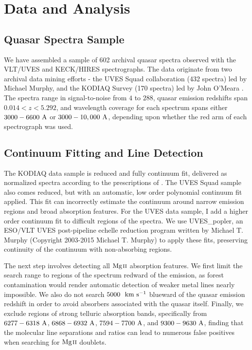 \documentclass[iop,apj,numberedappendix,appendixfloats,twocolappendix]{emulateapj}
\begin{document}

\section{Data and Analysis}
\label{sec:data}

\subsection{Quasar Spectra Sample}

We have assembled a sample of 602 archival quasar spectra observed with the VLT/UVES and KECK/HIRES spectrographs. The data originate from two archival data mining efforts - the UVES Squad collaboration (432 spectra) led by Michael Murphy, and the KODIAQ Survey (170 spectra) led by John O'Meara \citep{OMeara2015}. The spectra range in signal-to-noise from $4$ to $288$, quasar emission redshifts span $0.014 < z < 5.292$, and wavelength coverage for each spectrum spans either $3000 - 6600~\mathrm{\AA}$ or $3000 - 10,000~\mathrm{\AA}$, depending upon whether the red arm of each spectrograph was used.


\subsection{Continuum Fitting and Line Detection}
\label{sec:detection}

The KODIAQ data sample is reduced and fully continuum fit, delivered as normalized spectra according to the prescriptions of \cite{OMeara2015}. The UVES Squad sample also comes reduced, but with an automatic, low order polynomial continuum fit applied. This fit can incorrectly estimate the continuum around narrow emission regions and broad absorption features. For the UVES data sample, I add a higher order continuum fit to difficult regions of the spectra. We use UVES\_popler, an ESO/VLT UVES post-pipeline echelle reduction program written by Michael T. Murphy (Copyright 2003-2015 Michael T. Murphy) to apply these fits, preserving continuity of the continuum with non-absorbing regions. 

The next step involves detecting all ${\hbox{{\rm Mg}\kern 0.1em{\sc ii}}}$ absorption features. We first limit the search range to regions of the spectrum redward of the {\Lya} emission, as {\Lya} forest contamination would render automatic detection of weaker metal lines nearly impossible. We also do not search $5000~\mathrm{~\hbox{km~s$^{-1}$}}$ blueward of the quasar emission redshift in order to avoid absorbers associated with the quasar itself. Finally, we exclude regions of strong telluric absorption bands, specifically from $6277 - 6318~\mathrm{\AA}$, $6868 - 6932~\mathrm{\AA}$, $7594 - 7700~\mathrm{\AA}$, and $9300 - 9630~\mathrm{\AA}$, finding that the molecular line separations and ratios can lead to numerous false positives when searching for ${\hbox{{\rm Mg}\kern 0.1em{\sc ii}}}$ doublets. 
\end{document}
